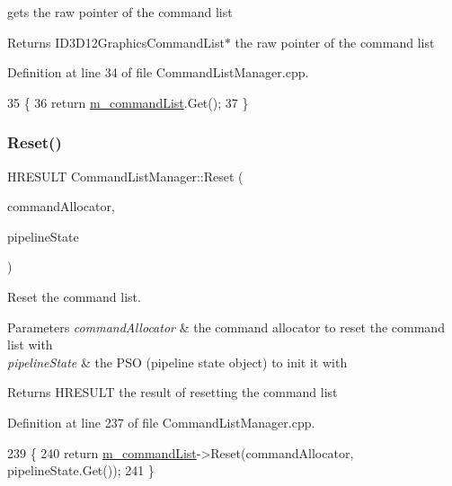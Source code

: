 gets the raw pointer of the command list 

\begin{DoxyReturn}{Returns}
I\+D3\+D12\+Graphics\+Command\+List$\ast$ the raw pointer of the command list 
\end{DoxyReturn}


Definition at line 34 of file Command\+List\+Manager.\+cpp.


\begin{DoxyCode}
35 \{
36     \textcolor{keywordflow}{return} \mbox{\hyperlink{class_command_list_manager_a1366f0acddca408167ffcab59be71ddb}{m\_commandList}}.Get();
37 \}
\end{DoxyCode}
\mbox{\label{class_command_list_manager_a7106132e048a3f62f97bf62f98e81588}} 
\subsubsection{\texorpdfstring{Reset()}{Reset()}}
{\footnotesize\ttfamily H\+R\+E\+S\+U\+LT Command\+List\+Manager\+::\+Reset (\begin{DoxyParamCaption}\item[{I\+D3\+D12\+Command\+Allocator $\ast$}]{command\+Allocator,  }\item[{Microsoft\+::\+W\+R\+L\+::\+Com\+Ptr$<$ I\+D3\+D12\+Pipeline\+State $>$}]{pipeline\+State }\end{DoxyParamCaption})}



Reset the command list. 


\begin{DoxyParams}{Parameters}
{\em command\+Allocator} & the command allocator to reset the command list with \\
\hline
{\em pipeline\+State} & the P\+SO (pipeline state object) to init it with \\
\hline
\end{DoxyParams}
\begin{DoxyReturn}{Returns}
H\+R\+E\+S\+U\+LT the result of resetting the command list 
\end{DoxyReturn}


Definition at line 237 of file Command\+List\+Manager.\+cpp.


\begin{DoxyCode}
239 \{
240     \textcolor{keywordflow}{return} \mbox{\hyperlink{class_command_list_manager_a1366f0acddca408167ffcab59be71ddb}{m\_commandList}}->Reset(commandAllocator, pipelineState.Get());
241 \}
\end{DoxyCode}
\mbox{\label{class_command_list_manager_a33a7c452731ebd9a2d8251874e120b13}} 
